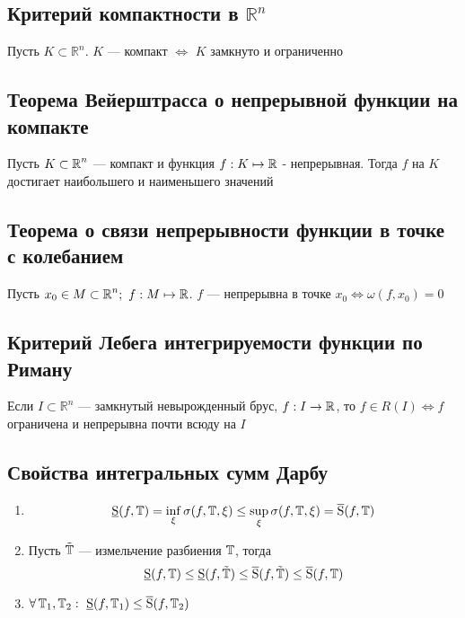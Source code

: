 \documentclass[a4paper]{article}
\begin{document}
\subsection{Критерий компактности в $\mathbb{R}^n$}
\theorem Пусть $K\subset \mathbb{R}^n$. $K$ — компакт $\Longleftrightarrow$ $K$ замкнуто и ограниченно

\subsection{Теорема Вейерштрасса о непрерывной функции на компакте}
\theorem Пусть $K\subset \operatorname{\mathbb{R}}^n$ — компакт и функция $f: K\mapsto \operatorname{\mathbb{R}}$ - непрерывная. Тогда $f$ на $K$ достигает наибольшего и наименьшего значений

\subsection{Теорема о связи непрерывности функции в точке с колебанием}
\theorem Пусть $x_0 \in M \subset \operatorname{\mathbb{R}}^n; \,\, f: M\mapsto\operatorname{\mathbb{R}}$. $f$ — непрерывна в точке $x_0 \iff \omega(f, x_0) = 0$

\subsection{Критерий Лебега интегрируемости функции по Риману}
\theorem Если $I\subset \mathbb{R}^n$ — замкнутый невырожденный брус, $f: I\to\operatorname{\mathbb{R}}$, то $f\in R(I) \iff f$ ограничена и непрерывна почти всюду на $I$

\subsection{Свойства интегральных сумм Дарбу}
\begin{enumerate}
    \item \begin{equation*}
        \operatorname{\underline{S}}(f, \operatorname{\mathbb{T}}) = \inf_{\xi}\sigma(f, \operatorname{\mathbb{T}}, \xi) \le \sup_{\xi}\sigma(f, \operatorname{\mathbb{T}}, \xi) = \operatorname{\overline{S}}(f, \operatorname{\mathbb{T}})
    \end{equation*}

    \item Пусть $\tilde{\operatorname{\mathbb{T}}}$ — измельчение разбиения $\operatorname{\mathbb{T}}$, тогда
    \begin{equation*}
        \operatorname{\underline{S}}(f, \operatorname{\mathbb{T}}) \le \operatorname{\underline{S}}(f, \tilde{\operatorname{\mathbb{T}}}) \le \operatorname{\overline{S}}(f, \tilde{\operatorname{\mathbb{T}}}) \le \operatorname{\overline{S}}(f, \operatorname{\mathbb{T}})
    \end{equation*}

    \item $\forall \operatorname{\mathbb{T}}_1, \operatorname{\mathbb{T}}_2:\ \operatorname{\underline{S}}(f, \operatorname{\mathbb{T}}_1) \le \operatorname{\overline{S}}(f, \operatorname{\mathbb{T}}_2)$
\end{enumerate}
\end{document}
